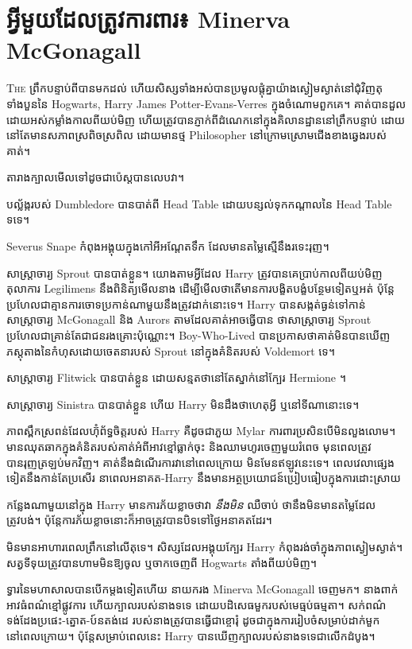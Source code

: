 \chapter{អ្វីមួយដែលត្រូវការពារ៖ Minerva McGonagall}

\lettrine{T}{he} ព្រឹកបន្ទាប់ពីបានមកដល់ ហើយសិស្សទាំងអស់បានប្រមូលផ្តុំគ្នាយ៉ាងស្ងៀមស្ងាត់នៅជុំវិញតុទាំងបួននៃ Hogwarts, Harry James Potter-Evans-Verres ក្នុងចំណោមពួកគេ។ គាត់​បាន​ដួល​ដោយ​អស់កម្លាំង​កាលពី​យប់មិញ ហើយ​ត្រូវ​បាន​ភ្ញាក់​ពី​ដំណេក​នៅ​ក្នុង​គិលានដ្ឋាន​នៅ​ព្រឹក​បន្ទាប់ ដោយ​នៅតែ​មាន​សភាព​ស្រពិចស្រពិល ដោយ​មាន​ថ្ម Philosopher នៅក្រោម​ស្រោមជើង​ខាងឆ្វេង​របស់គាត់។

តារាងក្បាលមើលទៅដូចជាប៉េស្តបានលេបវា។

បល្ល័ង្ករបស់ Dumbledore បានបាត់ពី Head Table ដោយបន្សល់ទុកកណ្តាលនៃ Head Table ទទេ។

Severus Snape កំពុង​អង្គុយ​ក្នុង​កៅអី​អណ្តែត​ទឹក ដែល​មាន​តម្លៃ​ស្មើ​នឹង​រទេះ​រុញ។

សាស្រ្តាចារ្យ Sprout បានបាត់ខ្លួន។ យោងតាមអ្វីដែល Harry ត្រូវបានគេប្រាប់កាលពីយប់មិញ តុលាការ Legilimens នឹងពិនិត្យមើលនាង ដើម្បីមើលថាតើមានការបង្ខិតបង្ខំបន្ថែមទៀតឬអត់ ប៉ុន្តែប្រហែលជាគ្មានការចោទប្រកាន់ណាមួយនឹងត្រូវដាក់នោះទេ។ Harry បានសង្កត់ធ្ងន់ទៅកាន់សាស្រ្តាចារ្យ McGonagall និង Aurors តាមដែលគាត់អាចធ្វើបាន ថាសាស្រ្តាចារ្យ Sprout ប្រហែលជាគ្រាន់តែជាជនរងគ្រោះប៉ុណ្ណោះ។ Boy-Who-Lived បានប្រកាសថាគាត់មិនបានឃើញភស្តុតាងនៃកំហុសដោយចេតនារបស់ Sprout នៅក្នុងគំនិតរបស់ Voldemort ទេ។

សាស្រ្តាចារ្យ Flitwick បានបាត់ខ្លួន ដោយសន្មតថានៅតែស្នាក់នៅក្បែរ Hermione ។

សាស្រ្តាចារ្យ Sinistra បានបាត់ខ្លួន ហើយ Harry មិនដឹងថាហេតុអ្វី ឬនៅទីណានោះទេ។

ភាពស្ពឹកស្រពន់ដែលហ៊ុំព័ទ្ធចិត្តរបស់ Harry គឺដូចជាភួយ Mylar ការពារប្រសិនបើមិនលួងលោម។ មានឈុតឆាកក្នុងគំនិតរបស់គាត់អំពីអាវខ្មៅធ្លាក់ចុះ និងឈាមហូរចេញមួយរំពេច មុនពេលត្រូវបានរុញត្រឡប់មកវិញ។ គាត់នឹងដំណើរការវានៅពេលក្រោយ មិនមែនឥឡូវនេះទេ។ ពេលវេលាផ្សេងទៀតនឹងកាន់តែប្រសើរ នាពេលអនាគត-Harry នឹងមានអត្ថប្រយោជន៍ប្រៀបធៀបក្នុងការដោះស្រាយ

កន្លែងណាមួយនៅក្នុង Harry មានការភ័យខ្លាចថាវា \emph{នឹងមិន } ឈឺចាប់ ថានឹងមិនមានតម្លៃដែលត្រូវបង់។ ប៉ុន្តែ​ការ​ភ័យ​ខ្លាច​នោះ​ក៏​អាច​ត្រូវ​បាន​បិទ​ទៅ​ថ្ងៃ​អនាគត​ដែរ។

មិនមានអាហារពេលព្រឹកនៅលើតុទេ។ សិស្ស​ដែល​អង្គុយ​ក្បែរ Harry កំពុង​រង់​ចាំ​ក្នុង​ភាព​ស្ងៀម​ស្ងាត់។ សត្វ​ទីទុយ​ត្រូវ​បាន​ហាម​មិន​ឱ្យ​ចូល ឬ​ចាក​ចេញ​ពី Hogwarts តាំង​ពី​យប់​មិញ។

ទ្វារនៃមហាសាលបានបើកម្តងទៀតហើយ នាយករង Minerva McGonagall ចេញមក។ នាង​ពាក់​អាវ​ធំ​ពណ៌​ខ្មៅ​ផ្លូវការ ហើយ​ក្បាល​របស់​នាង​ទទេ ដោយ​បដិសេធ​មួក​របស់​មេធ្មប់​ធម្មតា។ សក់ពណ៌ទង់ដែងប្រផេះ-ត្នោត-ប៍នតង់ដេ របស់នាងត្រូវបានធ្វើជាខ្ចោរុំ ដូចជាក្នុងការរៀបចំសម្រាប់ដាក់មួកនៅពេលក្រោយ។ ប៉ុន្តែសម្រាប់ពេលនេះ Harry បានឃើញក្បាលរបស់នាងទទេជាលើកដំបូង។

